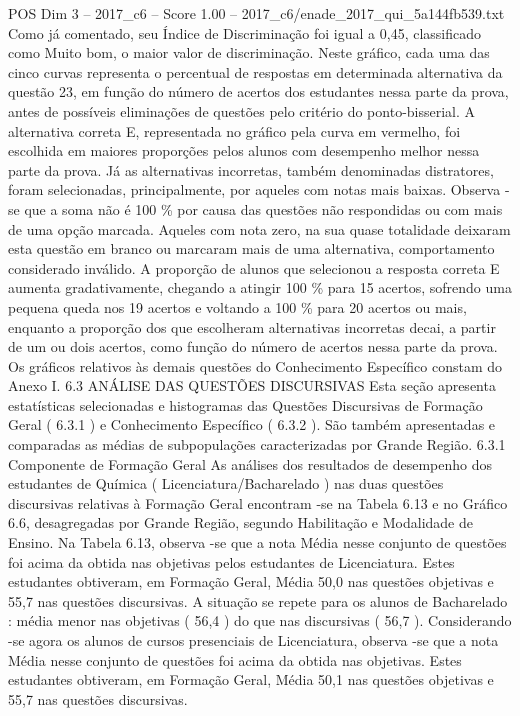 \begin{textsample}{POS Dim 3 – 2017\_c6 – Score 1.00 – 2017\_c6/enade\_2017\_qui\_5a144fb539.txt}
Como já comentado, seu Índice de Discriminação foi igual a 0,45, classificado como Muito bom, o maior valor de discriminação.
Neste gráfico, cada uma das cinco curvas representa o percentual de respostas em determinada alternativa da questão 23, em função do número de acertos dos estudantes nessa parte da prova, antes de possíveis eliminações de questões pelo critério do ponto-bisserial.
A alternativa correta E, representada no gráfico pela curva em vermelho, foi escolhida em maiores proporções pelos alunos com desempenho melhor nessa parte da prova.
Já as alternativas incorretas, também denominadas distratores, foram selecionadas, principalmente, por aqueles com notas mais baixas.
Observa -se que a soma não é 100 \% por causa das questões não respondidas ou com mais de uma opção marcada.
Aqueles com nota zero, na sua quase totalidade deixaram esta questão em branco ou marcaram mais de uma alternativa, comportamento considerado inválido.
A proporção de alunos que selecionou a resposta correta E aumenta gradativamente, chegando a atingir 100 \% para 15 acertos, sofrendo uma pequena queda nos 19 acertos e voltando a 100 \% para 20 acertos ou mais, enquanto a proporção dos que escolheram alternativas incorretas decai, a partir de um ou dois acertos, como função do número de acertos nessa parte da prova.
Os gráficos relativos às demais questões do Conhecimento Específico constam do Anexo I. 6.3 ANÁLISE DAS QUESTÕES DISCURSIVAS Esta seção apresenta estatísticas selecionadas e histogramas das Questões Discursivas de Formação Geral ( 6.3.1 ) e Conhecimento Específico ( 6.3.2 ).
São também apresentadas e comparadas as médias de subpopulações caracterizadas por Grande Região. 6.3.1 Componente de Formação Geral As análises dos resultados de desempenho dos estudantes de Química ( Licenciatura/Bacharelado ) nas duas questões discursivas relativas à Formação Geral encontram -se na Tabela 6.13 e no Gráfico 6.6, desagregadas por Grande Região, segundo Habilitação e Modalidade de Ensino.
Na Tabela 6.13, observa -se que a nota Média nesse conjunto de questões foi acima da obtida nas objetivas pelos estudantes de Licenciatura.
Estes estudantes obtiveram, em Formação Geral, Média 50,0 nas questões objetivas e 55,7 nas questões discursivas.
A situação se repete para os alunos de Bacharelado : média menor nas objetivas ( 56,4 ) do que nas discursivas ( 56,7 ).
Considerando -se agora os alunos de cursos presenciais de Licenciatura, observa -se que a nota Média nesse conjunto de questões foi acima da obtida nas objetivas.
Estes estudantes obtiveram, em Formação Geral, Média 50,1 nas questões objetivas e 55,7 nas questões discursivas.

\end{textsample}
